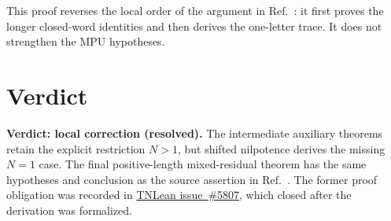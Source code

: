 \documentclass{article}
\begin{document}
This proof reverses the local order of the argument in
Ref.~\cite{Cirac2017MPU}: it first proves the longer closed-word identities and
then derives the one-letter trace. It does not strengthen the MPU hypotheses.

\section{Verdict}

\textbf{Verdict: local correction (resolved).} The intermediate auxiliary
theorems retain the explicit restriction $N>1$, but shifted nilpotence derives
the missing $N=1$ case. The final positive-length mixed-residual theorem has
the same hypotheses and conclusion as the source assertion in
Ref.~\cite{Cirac2017MPU}. The former proof obligation was recorded in
\href{https://github.com/LionSR/TNLean/issues/5807}{TNLean issue~\#5807},
which closed after the derivation was formalized.



\end{document}
